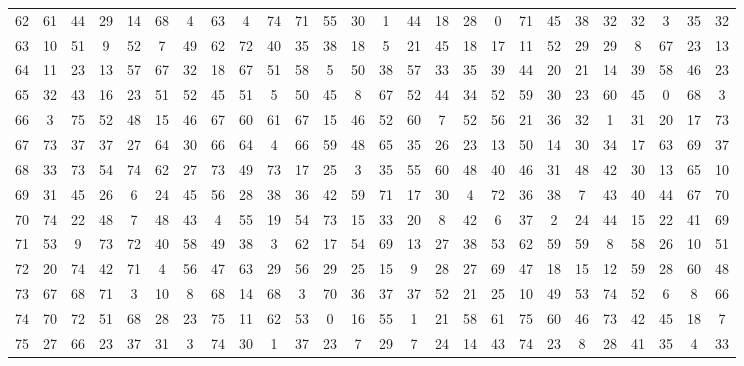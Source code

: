 \begin{table}
\begin{tabular}{c c c c c c c c c c c c c c c c c c c c c c c c c c }
62 & 61 & 44 & 29 & 14 & 68 & 4 & 63 & 4 & 74 & 71 & 55 & 30 & 1 & 44 & 18 & 28 & 0 & 71 & 45 & 38 & 32 & 32 & 3 & 35 & 32 \\
63 & 10 & 51 & 9 & 52 & 7 & 49 & 62 & 72 & 40 & 35 & 38 & 18 & 5 & 21 & 45 & 18 & 17 & 11 & 52 & 29 & 29 & 8 & 67 & 23 & 13 \\
64 & 11 & 23 & 13 & 57 & 67 & 32 & 18 & 67 & 51 & 58 & 5 & 50 & 38 & 57 & 33 & 35 & 39 & 44 & 20 & 21 & 14 & 39 & 58 & 46 & 23 \\
65 & 32 & 43 & 16 & 23 & 51 & 52 & 45 & 51 & 5 & 50 & 45 & 8 & 67 & 52 & 44 & 34 & 52 & 59 & 30 & 23 & 60 & 45 & 0 & 68 & 3 \\
66 & 3 & 75 & 52 & 48 & 15 & 46 & 67 & 60 & 61 & 67 & 15 & 46 & 52 & 60 & 7 & 52 & 56 & 21 & 36 & 32 & 1 & 31 & 20 & 17 & 73 \\
67 & 73 & 37 & 37 & 27 & 64 & 30 & 66 & 64 & 4 & 66 & 59 & 48 & 65 & 35 & 26 & 23 & 13 & 50 & 14 & 30 & 34 & 17 & 63 & 69 & 37 \\
68 & 33 & 73 & 54 & 74 & 62 & 27 & 73 & 49 & 73 & 17 & 25 & 3 & 35 & 55 & 60 & 48 & 40 & 46 & 31 & 48 & 42 & 30 & 13 & 65 & 10 \\
69 & 31 & 45 & 26 & 6 & 24 & 45 & 56 & 28 & 38 & 36 & 42 & 59 & 71 & 17 & 30 & 4 & 72 & 36 & 38 & 7 & 43 & 40 & 44 & 67 & 70 \\
70 & 74 & 22 & 48 & 7 & 48 & 43 & 4 & 55 & 19 & 54 & 73 & 15 & 33 & 20 & 8 & 42 & 6 & 37 & 2 & 24 & 44 & 15 & 22 & 41 & 69 \\
71 & 53 & 9 & 73 & 72 & 40 & 58 & 49 & 38 & 3 & 62 & 17 & 54 & 69 & 13 & 27 & 38 & 53 & 62 & 59 & 59 & 8 & 58 & 26 & 10 & 51 \\
72 & 20 & 74 & 42 & 71 & 4 & 56 & 47 & 63 & 29 & 56 & 29 & 25 & 15 & 9 & 28 & 27 & 69 & 47 & 18 & 15 & 12 & 59 & 28 & 60 & 48 \\
73 & 67 & 68 & 71 & 3 & 10 & 8 & 68 & 14 & 68 & 3 & 70 & 36 & 37 & 37 & 52 & 21 & 25 & 10 & 49 & 53 & 74 & 52 & 6 & 8 & 66 \\
74 & 70 & 72 & 51 & 68 & 28 & 23 & 75 & 11 & 62 & 53 & 0 & 16 & 55 & 1 & 21 & 58 & 61 & 75 & 60 & 46 & 73 & 42 & 45 & 18 & 7 \\
75 & 27 & 66 & 23 & 37 & 31 & 3 & 74 & 30 & 1 & 37 & 23 & 7 & 29 & 7 & 24 & 14 & 43 & 74 & 23 & 8 & 28 & 41 & 35 & 4 & 33 \\
\hline
\end{tabular}
\end{table}